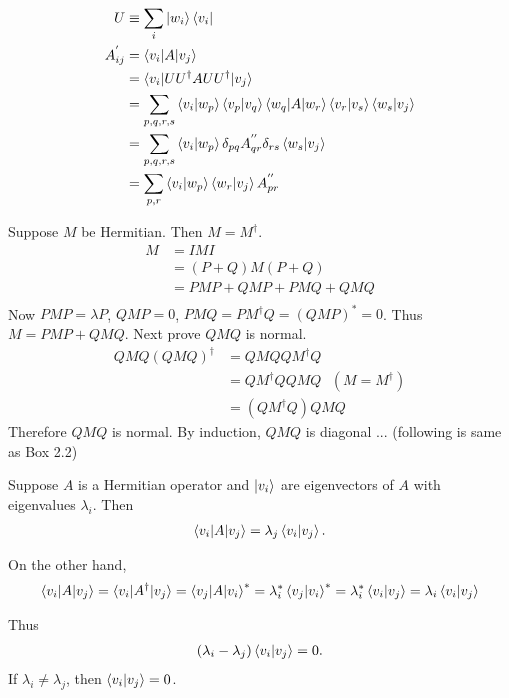 \begin{align*}
	U &\equiv \sum_i \ket{w_i}\bra{v_i}\\
	A_{ij}^{'} &= \braket{v_i | A | v_j}\\
	&= \braket{v_i | UU^\dagger A UU^\dagger | v_j}\\
	&= \sum_{p,q,r,s} \braket{v_i | w_p} \braket{v_p | v_q} \braket{w_q | A | w_r} \braket{v_r | v_s} \braket{w_s | v_j}\\
	&= \sum_{p,q,r,s} \braket{v_i | w_p} \delta_{pq} A_{qr}^{''} \delta_{rs}  \braket{w_s | v_j}\\
	&= \sum_{p,r}  \braket{v_i | w_p}  \braket{w_r | v_j} A_{pr}^{''}
\end{align*}



Suppose $M$ be Hermitian. Then $M = M^\dagger$.
\begin{align*}
	M &= IMI\\
		&= (P+Q) M (P+Q)\\
		&= PMP + QMP + PMQ + QMQ\\
\end{align*}
Now $PMP = \lambda P$, $QMP = 0$, $PMQ = PM^\dagger Q = (QMP)^* = 0$.
Thus $M = PMP + QMQ$.
Next prove $QMQ$ is normal.
\begin{align*}
	QMQ (QMQ)^\dagger &= QMQ QM^\dagger Q\\
		&= QM^\dagger Q QMQ ~~~ (M = M^\dagger)\\
		&= (QM^\dagger Q) QMQ
\end{align*}
Therefore $QMQ$ is normal.
By induction, $QMQ$ is diagonal ... (following is same as Box 2.2)


Suppose $A$ is a Hermitian operator and $\ket{v_i}$ are eigenvectors of $A$ with eigenvalues $\lambda_i$.
Then
\begin{align*}
	\braket{v_i | A | v_j} = \lambda_j \braket{v_i | v_j}.
\end{align*}

On the other hand,
\begin{align*}
	\braket{v_i | A | v_j} = \braket{v_i | A^\dagger | v_j}
	= \braket{v_j | A | v_i}^*
	= \lambda_i^* \braket{v_j | v_i}^*
	=  \lambda_i^* \braket{v_i | v_j}
	=  \lambda_i \braket{v_i | v_j}
\end{align*}

Thus
\begin{align*}
	(\lambda_i - \lambda_j) \braket{v_i | v_j}  = 0.
\end{align*}
If $\lambda_i \neq \lambda_j$, then $\braket{v_i | v_j}  = 0$.


